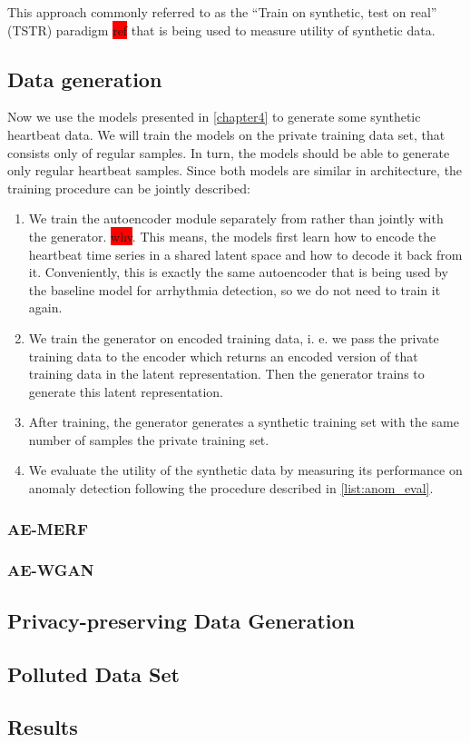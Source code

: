 This approach commonly referred to as the ``Train on synthetic, test on real'' (TSTR) paradigm \colorbox{red}{ref} that is being used to measure utility of synthetic data.

\subsection{Data generation}
Now we use the models presented in \cref{chapter4} to generate some synthetic heartbeat data. We will train the models on the private training data set, that consists only of regular samples. In turn, the models should be able to generate only regular heartbeat samples. Since both models are similar in architecture, the training procedure can be jointly described:
\begin{enumerate}
    \item We train the autoencoder module separately from rather than jointly with the generator. \colorbox{red}{why}. This means, the models first learn how to encode the heartbeat time series in a shared latent space and how to decode it back from it. Conveniently, this is exactly the same autoencoder that is being used by the baseline model for arrhythmia detection, so we do not need to train it again.
    \item We train the generator on encoded training data, i. e. we pass the private training data to the encoder which returns an encoded version of that training data in the latent representation. Then the generator trains to generate this latent representation.
    \item After training, the generator generates a synthetic training set with the same number of samples the private training set.
    \item We evaluate the utility of the synthetic data by measuring its performance on anomaly detection following the procedure described in \cref{list:anom_eval}.
\end{enumerate}

\subsubsection*{AE-MERF}
\subsubsection*{AE-WGAN}

\subsection{Privacy-preserving Data Generation}

\subsection{Polluted Data Set}

\subsection{Results}